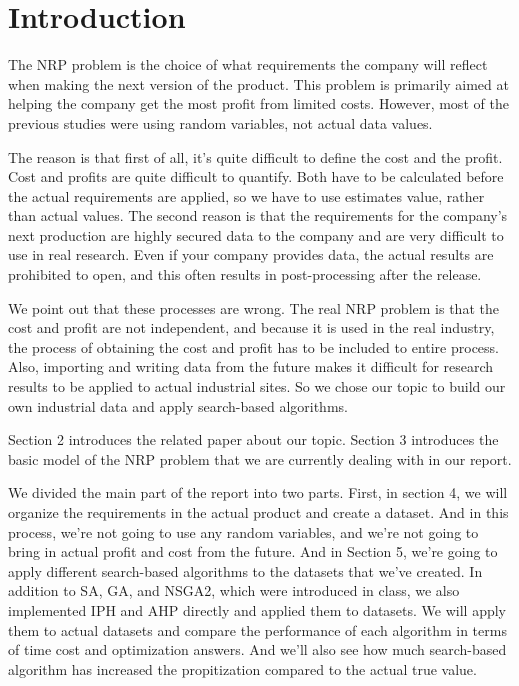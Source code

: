 \section{Introduction}
 The NRP problem is the choice of what requirements the company will reflect when making the next version of the product. This problem is primarily aimed at helping the company get the most profit from limited costs. However, most of the previous studies were using random variables, not actual data values. 
 
 The reason is that first of all, it's quite difficult to define the cost and the profit. Cost and profits are quite difficult to quantify. Both have to be calculated before the actual requirements are applied, so we have to use estimates value, rather than actual values. The second reason is that the requirements for the company's next production are highly secured data to the company and are very difficult to use in real research. Even if your company provides data, the actual results are prohibited to open, and this often results in post-processing after the release.
 
 We point out that these processes are wrong. The real NRP problem is that the cost and profit are not independent, and because it is used in the real industry, the process of obtaining the cost and profit has to be included to entire process. Also, importing and writing data from the future makes it difficult for research results to be applied to actual industrial sites. So we chose our topic to build our own industrial data and apply search-based algorithms. 
 
Section 2 introduces the related paper about our topic. Section 3 introduces the basic model of the NRP problem that we are currently dealing with in our report.

We divided the main part of the report into two parts. First, in section 4, we will organize the requirements in the actual product and create a dataset. And in this process, we're not going to use any random variables, and we're not going to bring in actual profit and cost from the future. 
And in Section 5, we're going to apply different search-based algorithms to the datasets that we've created. In addition to SA, GA, and NSGA2, which were introduced in class, we also implemented IPH and AHP directly and applied them to datasets. We will apply them to actual datasets and compare the performance of each algorithm in terms of time cost and optimization answers. And we'll also see how much search-based algorithm has increased the propitization compared to the actual true value.

